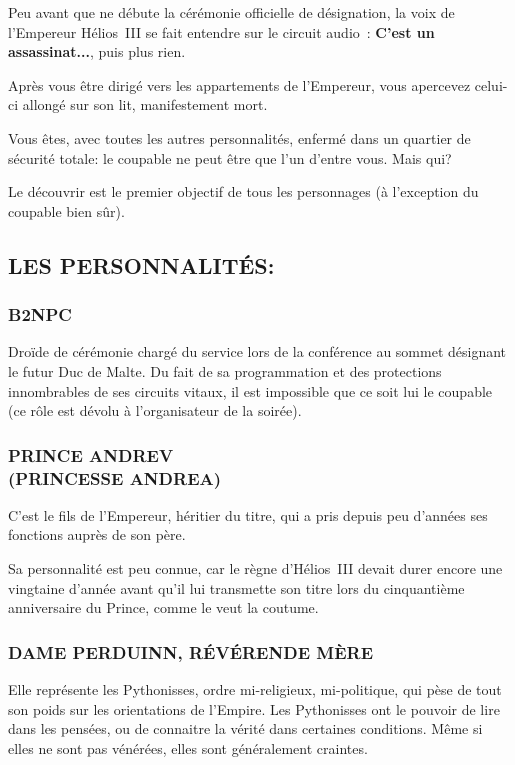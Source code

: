 \documentclass[14pt,twocolumn]{extarticle}
\begin{document}
Peu avant que ne débute la cérémonie officielle de désignation, la voix de
l'Empereur Hélios~III se fait entendre sur le circuit audio~:
\textbf{\og C'est un assassinat...\fg}, puis plus rien.

Après vous être dirigé vers les appartements de l'Empereur, vous apercevez
celui-ci allongé sur son lit, manifestement mort.

Vous êtes, avec toutes les autres personnalités, enfermé dans un quartier de
sécurité totale: le coupable ne peut être que l'un d'entre vous. Mais qui?

Le découvrir est le premier objectif de tous les personnages (à l'exception du
coupable bien sûr).

\clearpage

\subsection{LES PERSONNALITÉS:}

\subsubsection{B2NPC}

Droïde de cérémonie chargé du service lors de la conférence au sommet désignant
le futur Duc de Malte. Du fait de sa programmation et des protections
innombrables de ses circuits vitaux, il est impossible que ce soit lui le
coupable (ce rôle est dévolu à l'organisateur de la soirée).

\subsubsection{PRINCE ANDREV\\(PRINCESSE ANDREA)}

C'est le fils de l'Empereur, héritier du titre, qui a pris depuis peu d'années
ses fonctions auprès de son père.

Sa personnalité est peu connue, car le règne d'Hélios~III devait durer
encore une vingtaine d'année avant qu'il lui transmette son titre lors du
cinquantième anniversaire du Prince, comme le veut la coutume.

\subsubsection{DAME PERDUINN, RÉVÉRENDE MÈRE}

Elle représente les Pythonisses, ordre mi-religieux, mi-politique, qui pèse de
tout son poids sur les orientations de l'Empire. Les Pythonisses ont le pouvoir
de lire dans les pensées, ou de connaitre la vérité dans certaines conditions.
Même si elles ne sont pas vénérées, elles sont généralement craintes.
\end{document}
